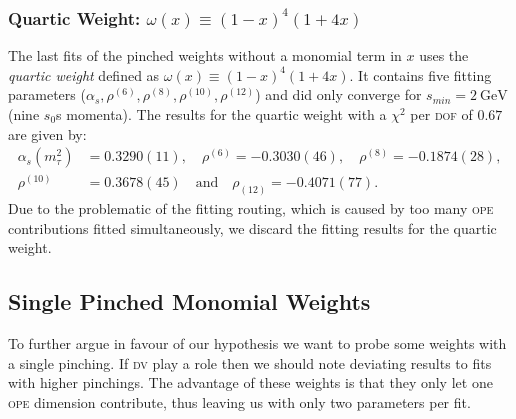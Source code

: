 \documentclass[../../index.tex]{subfiles}
\begin{document}
\subsubsection{Quartic Weight: \(\omega(x) \equiv (1-x)^4(1+4x)\)}
\label{sec:quarticWeight}
The last fits of the pinched weights without a monomial term in \(x\) uses the
\textit{quartic weight} defined as \(\omega(x) \equiv (1-x)^4(1+4x)\). It
contains five fitting parameters (\(\alpha_s, \rho^{(6)}, \rho^{(8)},
\rho^{(10)}, \rho^{(12)}\)) and did only converge for
\(s_{min}=\SI{2}{\giga\eV}\) (nine \(s_0\)s momenta). The results for the
quartic weight with a \(\chi^2\) per \textsc{dof} of \(0.67\) are given by:
\begin{equation}
  \begin{split}
    \alpha_s(m_\tau^2) &= 0.3290(11), \quad \rho^{(6)}=-0.3030(46), \quad \rho^{(8)}=-0.1874(28), \\
    \rho^{(10)} &= 0.3678(45) \quad \text{and} \quad \rho_{(12)}=-0.4071(77).
  \end{split}
\end{equation}
Due to the problematic of the fitting routing, which is caused by too many
\textsc{ope} contributions fitted simultaneously, we discard the fitting
results for the quartic weight.


\subsection{Single Pinched Monomial Weights}
To further argue in favour of our hypothesis we want to probe some weights with
a single pinching. If \textsc{dv} play a role then we should note deviating
results to fits with higher pinchings. The advantage of these weights is that
they only let one \textsc{ope} dimension contribute, thus leaving us with only
two parameters per fit.
\end{document}
